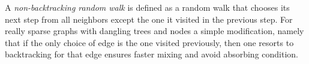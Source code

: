 \documentclass{article} %
\begin{document}


A \emph{non-backtracking random walk} is defined as a random walk that chooses its next step from all neighbors except the one it visited in the previous step. For really sparse graphs with dangling trees and nodes a simple modification, namely that if the only choice of edge is the one visited previously, then one resorts to backtracking for that edge ensures faster mixing and avoid absorbing condition. 

\end{document}
